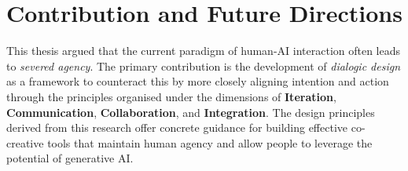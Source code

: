 \section{Contribution and Future Directions}
This thesis argued that the current paradigm of human-AI interaction often leads to \textit{severed agency}. The primary contribution is the development of \textit{dialogic design} as a framework to counteract this by more closely aligning intention and action through the principles organised under the dimensions of \textbf{Iteration}, \textbf{Communication}, \textbf{Collaboration}, and \textbf{Integration}. The design principles derived from this research offer concrete guidance for building effective co-creative tools that maintain human agency and allow people to leverage the potential of generative AI.


